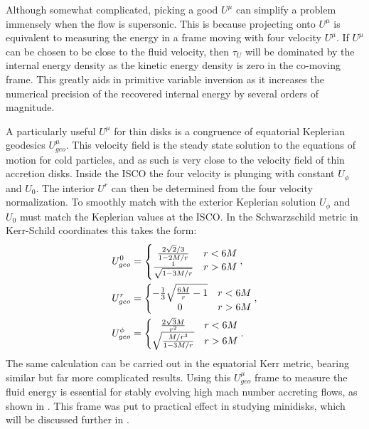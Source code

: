 Although somewhat complicated, picking a good $U^\mu$ can simplify a problem immensely when the flow is supersonic.  This is because projecting onto $U^\mu$ is equivalent to measuring the energy in a frame moving with four velocity $U^\mu$.  If $U^\mu$ can be chosen to be close to the fluid velocity, then $\tau_U$ will be dominated by the internal energy density as the kinetic energy density is zero in the co-moving frame.  This greatly aids in primitive variable inversion as it increases the numerical precision of the recovered internal energy by several orders of magnitude.

A particularly useful $U^\mu$ for thin disks is a congruence of equatorial Keplerian geodesics $U^\mu_{geo}$.  This velocity field is the steady state solution to the equations of motion for cold particles, and as such is very close to the velocity field of thin accretion disks.  Inside the ISCO the four velocity is plunging with constant $U_\phi$ and $U_0$.  The interior $U^r$ can then be determined from the four velocity normalization. To smoothly match with the exterior Keplerian solution $U_\phi$ and $U_0$ must match the Keplerian values at the ISCO.  In the Schwarzschild metric in Kerr-Schild coordinates this takes the form:
\begin{align}
	U^0_{geo} &= \left \{ \begin{matrix} \frac{2\sqrt{2}/3}{1-2M/r} & r < 6M \\
						\frac{1}{\sqrt{1-3M/r}} & r > 6M \end{matrix} \right . , \nonumber \\
	U^r_{geo} &= \left \{ \begin{matrix} -\frac{1}{3}\sqrt{\frac{6M}{r}-1} & r < 6M \\
						0 & r > 6M \end{matrix} \right . , \nonumber \\
	U^\phi_{geo} &= \left \{ \begin{matrix}  \frac{2 \sqrt{3} M}{r^2} & r < 6M \\
						\sqrt{\frac{M/r^3}{1-3M/r}} & r > 6M \end{matrix} \right . . \eqlabel{Ugeo}
\end{align}
The same calculation can be carried out in the equatorial Kerr metric, bearing similar but far more complicated results.  Using this $U^\mu_{geo}$ frame to measure the fluid energy is essential for stably evolving high mach number accreting flows, as shown in .  This frame was put to practical effect in studying minidisks, which will be discussed further in .

